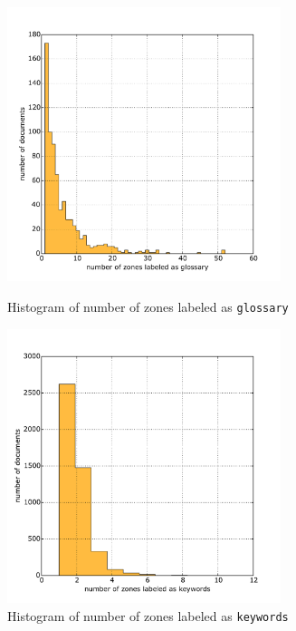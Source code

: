 \begin{appendix}
\begin{figure}
\centering
\begin{minipage}[t!]{0.48\linewidth}
  \includegraphics[width=8cm]{plots/glossary_histogram}
  \caption{Histogram of number of zones labeled as \texttt{glossary}}
  \label{fig:glossary_histogram}
\end{minipage}
\quad
\begin{minipage}[t!]{0.48\linewidth}
  \includegraphics[width=8cm]{plots/keywords_histogram}
  \caption{Histogram of number of zones labeled as \texttt{keywords}}
  \label{fig:keywords_histogram}
\end{minipage}
\end{figure}


\end{appendix}

